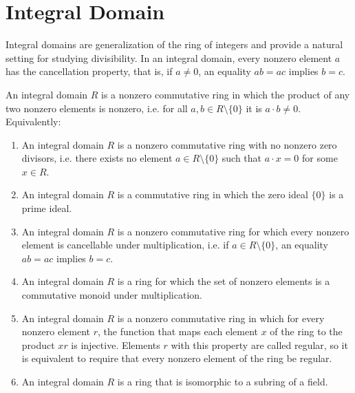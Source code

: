 \documentclass[a4paper]{book}
\theoremstyle{break}
\theoremstyle{plain}
\begin{document}
\newpage

\section{Integral Domain}

Integral domains are generalization of the ring of integers and provide a natural setting for studying divisibility. In an integral domain, every nonzero element \(a\) has the cancellation property, that is, if \(a \neq 0\), an equality \(ab = ac\) implies \(b = c\).

\begin{definition}

    \medskip

    An {\color{maththen}integral domain} \(R\) is a {\color{mathif}nonzero commutative ring} in which the product of any two nonzero elements is nonzero, i.e. for all \(a, b \in R \setminus \{0\}\) it is \(a \cdot b \neq 0\). Equivalently:
    \begin{enumerate}
        \item An {\color{maththen}integral domain} \(R\) is a {\color{mathif}nonzero commutative ring} with no nonzero {\color{mathif}zero divisors}, i.e. there exists no element \(a \in R \setminus \{0\}\) such that \(a \cdot x = 0\) for some \(x \in R\).
        \item An {\color{maththen}integral domain} \(R\) is a {\color{mathif}commutative ring} in which the {\color{mathif}zero ideal} \(\{0\}\) is a {\color{mathif}prime ideal}.
        \item An {\color{maththen}integral domain} \(R\) is a {\color{mathif}nonzero commutative ring} for which every nonzero element is {\color{mathif}cancellable under multiplication}, i.e. if \(a \in R \setminus \{0\}\), an equality \(ab = ac\) implies \(b = c\).
        \item An {\color{maththen}integral domain} \(R\) is a {\color{mathif}ring} for which the {\color{mathif}set of nonzero elements} is a {\color{mathif}commutative monoid} under multiplication.
        \item An {\color{maththen}integral domain} \(R\) is a {\color{mathif}nonzero commutative ring} in which for every nonzero element \(r\), the {\color{mathif}function} that maps each element \(x\) of the ring to the product \(xr\) is {\color{mathif}injective}. Elements \(r\) with this property are called {\color{mathrem}regular}, so it is equivalent to require that every nonzero element of the ring be regular.
        \item An {\color{maththen}integral domain} \(R\) is a {\color{mathif}ring} that is {\color{mathif}isomorphic} to a {\color{mathif}subring} of a {\color{mathif}field}.
    \end{enumerate}
\end{definition}
\end{document}
